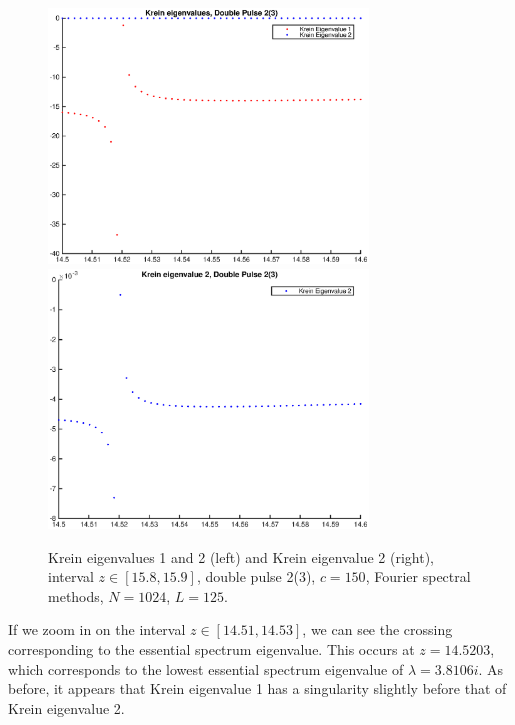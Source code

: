 \documentclass[12pt]{article}
\begin{document}
\begin{figure}[H]
	\includegraphics[width=8.5cm]{1500F_dp2_125_kreinzoom3.eps}
	\includegraphics[width=8.5cm]{1500F_dp2_125_kreinzoom4.eps}
	\caption{Krein eigenvalues 1 and 2 (left) and Krein eigenvalue 2 (right), interval $z \in [15.8, 15.9]$, double pulse 2(3), $c = 150$, Fourier spectral methods, $N = 1024$, $L = 125$. }
\end{figure}

If we zoom in on the interval $z \in [14.51, 14.53]$, we can see the crossing corresponding to the essential spectrum eigenvalue. This occurs at $z = 14.5203$, which corresponds to the lowest essential spectrum eigenvalue of $\lambda = 3.8106i$. As before, it appears that Krein eigenvalue 1 has a singularity slightly  before that of Krein eigenvalue 2.
\end{document}
